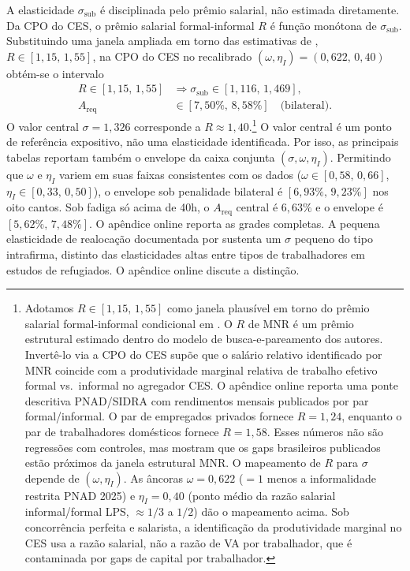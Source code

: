 \documentclass[10pt,twocolumn]{article}
\begin{document}
A elasticidade $\sigma_{\text{sub}}$ \'e disciplinada pelo pr\^emio salarial, n\~ao estimada diretamente. Da CPO do CES, o pr\^emio salarial formal-informal $R$ \'e fun\c{c}\~ao mon\'otona de $\sigma_{\text{sub}}$. Substituindo uma janela ampliada em torno das estimativas de \citeauthor{MeghirNaritaRobin2015}, $R\in[1{,}15,\,1{,}55]$, na CPO do CES no recalibrado $(\omega,\eta_I)=(0{,}622,\,0{,}40)$ obt\'em-se o intervalo
\begin{equation}\label{eq:sigma_interval}
\begin{aligned}
R\in[1{,}15,\,1{,}55]&\Rightarrow
\sigma_{\text{sub}}\in[1{,}116,\,1{,}469],\\
A_{\text{req}}&\in[7{,}50\%,\,8{,}58\%]
\quad\text{(bilateral).}
\end{aligned}
\end{equation}
O valor central $\sigma=1{,}326$ corresponde a $R\approx 1{,}40$.\footnote{Adotamos $R\in[1{,}15,\,1{,}55]$ como janela plaus\'ivel em torno do pr\^emio salarial formal-informal condicional em \citet{MeghirNaritaRobin2015}. O $R$ de MNR \'e um pr\^emio estrutural estimado dentro do modelo de busca-e-pareamento dos autores. Invert\^e-lo via a CPO do CES sup\~oe que o sal\'ario relativo identificado por MNR coincide com a produtividade marginal relativa de trabalho efetivo formal vs.\ informal no agregador CES. O ap\^endice online reporta uma ponte descritiva PNAD/SIDRA com rendimentos mensais publicados por par formal/informal. O par de empregados privados fornece $R=1{,}24$, enquanto o par de trabalhadores dom\'esticos fornece $R=1{,}58$. Esses n\'umeros n\~ao s\~ao regress\~oes com controles, mas mostram que os gaps brasileiros publicados est\~ao pr\'oximos da janela estrutural MNR. O mapeamento de $R$ para $\sigma$ depende de $(\omega,\eta_I)$. As \^ancoras $\omega=0{,}622$ ($= 1$ menos a informalidade restrita PNAD 2025) e $\eta_I=0{,}40$ (ponto m\'edio da raz\~ao salarial informal/formal LPS, $\approx 1/3$ a $1/2$) d\~ao o mapeamento acima. Sob concorr\^encia perfeita e salarista, a identifica\c{c}\~ao da produtividade marginal no CES usa a raz\~ao salarial, n\~ao a raz\~ao de VA por trabalhador, que \'e contaminada por gaps de capital por trabalhador.} O valor central \'e um ponto de refer\^encia expositivo, n\~ao uma elasticidade identificada. Por isso, as principais tabelas reportam tamb\'em o envelope da caixa conjunta $(\sigma,\omega,\eta_I)$. Permitindo que $\omega$ e $\eta_I$ variem em suas faixas consistentes com os dados ($\omega\in[0{,}58,\,0{,}66]$, $\eta_I\in[0{,}33,\,0{,}50]$), o envelope sob penalidade bilateral \'e $[6{,}93\%,\,9{,}23\%]$ nos oito cantos. Sob fadiga s\'o acima de 40h, o $A_{\text{req}}$ central \'e $6{,}63\%$ e o envelope \'e $[5{,}62\%,\,7{,}48\%]$. O ap\^endice online reporta as grades completas. A pequena elasticidade de realoca\c{c}\~ao documentada por \citet{DerenoncourtGerardLagosMontialoux2025} sustenta um $\sigma$ pequeno do tipo intrafirma, distinto das elasticidades altas entre tipos de trabalhadores em estudos de refugiados. O ap\^endice online discute a distin\c{c}\~ao.
\end{document}
